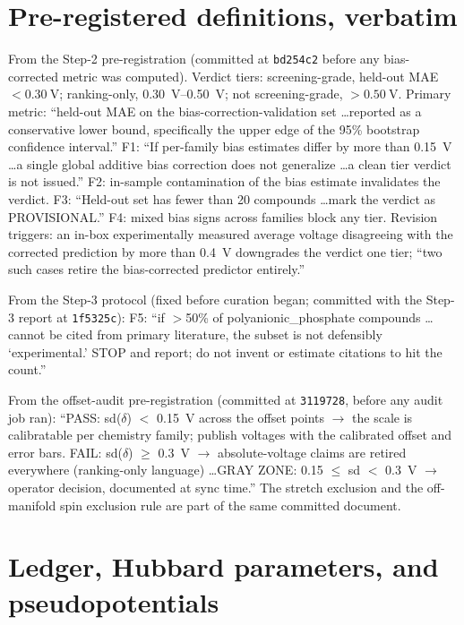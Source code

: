 \documentclass[reprint,aps,prb,amsmath,amssymb,nofootinbib,longbibliography]{revtex4-2}
\begin{document}
\section{Pre-registered definitions, verbatim}
\label{app:failure}

From the Step-2 pre-registration (committed at \texttt{bd254c2} before any
bias-corrected metric was computed). Verdict tiers: screening-grade,
held-out MAE $<\SI{0.30}{\volt}$; ranking-only, \SIrange{0.30}{0.50}{\volt};
not screening-grade, $>\SI{0.50}{\volt}$. Primary metric: ``held-out MAE on
the bias-correction-validation set \ldots reported as a conservative lower
bound, specifically the upper edge of the 95\% bootstrap confidence
interval.'' F1: ``If per-family bias estimates differ by more than 0.15~V
\ldots a single global additive bias correction does not generalize \ldots a
clean tier verdict is not issued.'' F2: in-sample contamination of the bias
estimate invalidates the verdict. F3: ``Held-out set has fewer than 20
compounds \ldots mark the verdict as PROVISIONAL.'' F4: mixed bias signs
across families block any tier. Revision triggers: an in-box
experimentally measured average voltage disagreeing with the corrected
prediction by more than \SI{0.4}{\volt} downgrades the verdict one tier;
``two such cases retire the bias-corrected predictor entirely.''

From the Step-3 protocol (fixed before curation began; committed with the
Step-3 report at \texttt{1f5325c}): F5: ``if $>$50\% of
polyanionic\_phosphate compounds \ldots cannot be cited from primary
literature, the subset is not defensibly `experimental.' STOP and report;
do not invent or estimate citations to hit the count.''

From the offset-audit pre-registration (committed at \texttt{3119728},
before any audit job ran): ``PASS: sd($\delta$) $<$ 0.15~V across the
offset points $\to$ the scale is calibratable per chemistry family; publish
voltages with the calibrated offset and error bars. FAIL: sd($\delta$)
$\ge$ 0.3~V $\to$ absolute-voltage claims are retired everywhere
(ranking-only language) \ldots GRAY ZONE: 0.15 $\le$ sd $<$ 0.3~V $\to$
operator decision, documented at sync time.'' The  stretch
exclusion and the off-manifold spin exclusion rule are part of the same
committed document.

\section{Ledger, Hubbard parameters, and pseudopotentials}
\label{app:ledger}
\end{document}
